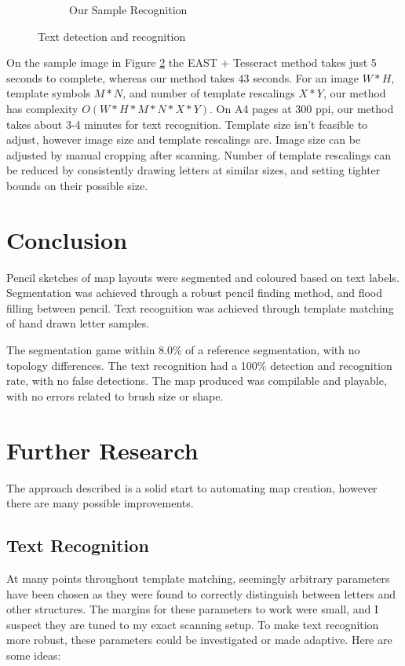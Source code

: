 \documentclass{IEEEtran}
\begin{document}
\begin{figure}[h]
\begin{subfigure}[b]{0.4\textwidth}
         \caption{Our Sample Recognition}
         \label{fig:textrec}
     \end{subfigure}
        \caption{Text detection and recognition}
        \label{fig:texttest}
\end{figure}

On the sample image in Figure \ref{fig:texttest} the EAST + Tesseract method takes just 5 seconds to complete, whereas our method takes 43 seconds. For an image $W*H$, template symbols $M*N$, and number of template rescalings $X*Y$, our method has complexity $O(W*H*M*N*X*Y)$. On A4 pages at 300 ppi, our method takes about 3-4 minutes for text recognition. Template size isn't feasible to adjust, however image size and template rescalings are. Image size can be adjusted by manual cropping after scanning. Number of template rescalings can be reduced by consistently drawing letters at similar sizes, and setting tighter bounds on their possible size.

\section{Conclusion}

Pencil sketches of map layouts were segmented and coloured based on text labels. Segmentation was achieved through a robust pencil finding method, and flood filling between pencil. Text recognition was achieved through template matching of hand drawn letter samples. 

The segmentation game within 8.0\% of a reference segmentation, with no topology differences. The text recognition had a 100\% detection and recognition rate, with no false detections. The map produced was compilable and playable, with no errors related to brush size or shape. 

\section{Further Research}

The approach described is a solid start to automating map creation, however there are many possible improvements.

\subsection{Text Recognition}

At many points throughout template matching, seemingly arbitrary parameters have been chosen as they were found to correctly distinguish between letters and other structures. The margins for these parameters to work were small, and I suspect they are tuned to my exact scanning setup. To make text recognition more robust, these parameters could be investigated or made adaptive. Here are some ideas:
\end{document}
